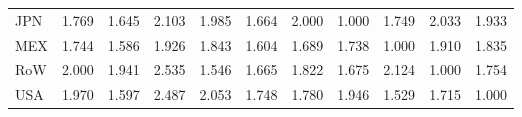 \begin{table}[htbp]
\begin{tabular}{lcccccccccc}
  JPN & \textcolor[RGB]{140,91,115}{1.769} & \textcolor[RGB]{199,129,56}{1.645} & \textcolor[RGB]{33,21,222}{2.103} & \textcolor[RGB]{66,43,189}{1.985} & \textcolor[RGB]{186,120,69}{1.664} & \textcolor[RGB]{59,38,196}{2.000} & \textcolor[RGB]{230,148,26}{1.000} & \textcolor[RGB]{148,96,107}{1.749} & \textcolor[RGB]{43,28,212}{2.033} & \textcolor[RGB]{84,54,171}{1.933} \\ 
  MEX & \textcolor[RGB]{153,99,102}{1.744} & \textcolor[RGB]{207,134,48}{1.586} & \textcolor[RGB]{89,58,166}{1.926} & \textcolor[RGB]{115,74,140}{1.843} & \textcolor[RGB]{201,130,54}{1.604} & \textcolor[RGB]{168,109,87}{1.689} & \textcolor[RGB]{156,101,99}{1.738} & \textcolor[RGB]{230,148,26}{1.000} & \textcolor[RGB]{97,63,158}{1.910} & \textcolor[RGB]{120,78,135}{1.835} \\ 
  RoW & \textcolor[RGB]{54,35,201}{2.000} & \textcolor[RGB]{82,53,173}{1.941} & \textcolor[RGB]{3,2,252}{2.535} & \textcolor[RGB]{214,139,41}{1.546} & \textcolor[RGB]{184,119,71}{1.665} & \textcolor[RGB]{122,79,133}{1.822} & \textcolor[RGB]{181,117,74}{1.675} & \textcolor[RGB]{23,15,232}{2.124} & \textcolor[RGB]{230,148,26}{1.000} & \textcolor[RGB]{145,94,110}{1.754} \\ 
  USA & \textcolor[RGB]{69,45,186}{1.970} & \textcolor[RGB]{204,132,51}{1.597} & \textcolor[RGB]{5,3,250}{2.487} & \textcolor[RGB]{41,26,214}{2.053} & \textcolor[RGB]{150,97,105}{1.748} & \textcolor[RGB]{135,87,120}{1.780} & \textcolor[RGB]{77,50,178}{1.946} & \textcolor[RGB]{219,142,36}{1.529} & \textcolor[RGB]{158,102,97}{1.715} & \textcolor[RGB]{230,148,26}{1.000} \\ 
   \hline
\end{tabular}
\end{table}
